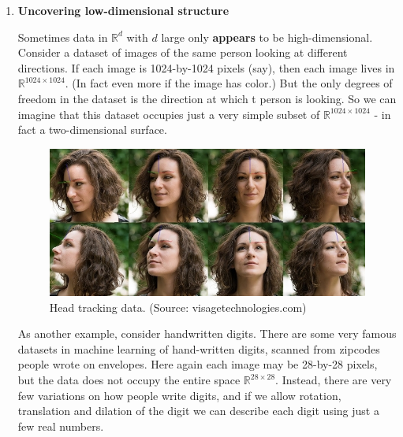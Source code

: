 \documentclass[11pt]{article}
\newcommand{\R}{\ensuremath{\mathbb{R}}}
\begin{document}
\begin{enumerate}
  \item {\bf Uncovering low-dimensional structure}

    Sometimes data in $\R^d$ with $d$ large only {\bf appears} to be high-dimensional. Consider a dataset of
    images of the same person looking at different directions. If each image is
    1024-by-1024 pixels (say), then each image lives in $\R^{1024\times 1024}$. (In fact
    even more if the image has color.) 
    But the only degrees of freedom in the dataset is the direction at which t
    person is looking. So we can imagine that this dataset occupies just a 
    very simple subset of $\R^{1024\times 1024}$ - in fact a two-dimensional surface.

    \begin{figure}[H]
      \centering
      \includegraphics[width=4.5in]{headtrack.jpg}  
          \caption{Head tracking data. (Source: visagetechnologies.com)}
    \end{figure}

    As another example, consider handwritten digits. There are some very famous
    datasets in machine learning of hand-written digits, scanned from 
    zipcodes people wrote on envelopes. Here again each image may be
    28-by-28 pixels, but the data does not occupy the entire space 
    $\R^{28\times 28}$. Instead, there are very few variations on how people write
    digits, and if we allow rotation, translation and dilation of the digit we
    can describe each digit using just a few real numbers. 


\end{enumerate}
\end{document}
